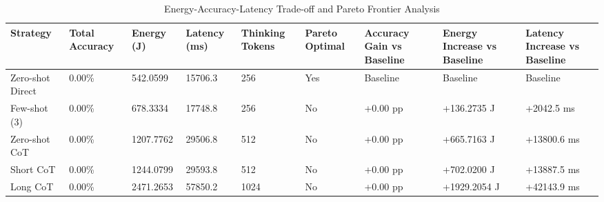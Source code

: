 \begin{table}
\caption{Energy-Accuracy-Latency Trade-off and Pareto Frontier Analysis}
\label{tab:tradeoff_comparison}
\begin{tabular}{lllllllll}
\toprule
Strategy & Total Accuracy & Energy (J) & Latency (ms) & Thinking Tokens & Pareto Optimal & Accuracy Gain vs Baseline & Energy Increase vs Baseline & Latency Increase vs Baseline \\
\midrule
Zero-shot Direct & 0.00\% & 542.0599 & 15706.3 & 256 & Yes & Baseline & Baseline & Baseline \\
Few-shot (3) & 0.00\% & 678.3334 & 17748.8 & 256 & No & +0.00 pp & +136.2735 J & +2042.5 ms \\
Zero-shot CoT & 0.00\% & 1207.7762 & 29506.8 & 512 & No & +0.00 pp & +665.7163 J & +13800.6 ms \\
Short CoT & 0.00\% & 1244.0799 & 29593.8 & 512 & No & +0.00 pp & +702.0200 J & +13887.5 ms \\
Long CoT & 0.00\% & 2471.2653 & 57850.2 & 1024 & No & +0.00 pp & +1929.2054 J & +42143.9 ms \\
\bottomrule
\end{tabular}
\end{table}
